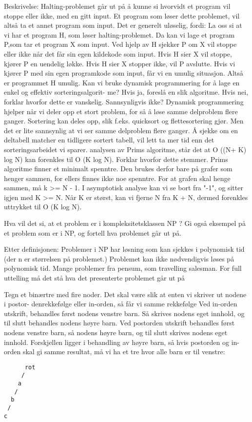 \documentclass[10pt,a4paper]{article}
\begin{document}
\begin{multicols}{4}
{Beskrivelse: Halting-problemet går ut på å kunne si hvorvidt et program vil stoppe eller
ikke, med en gitt input. Et program som løser dette problemet, vil altså ta et annet program
som input.
Det er generelt uløselig, fordi: La oss si at vi har et program H, som løser halting-problemet.
Da kan vi lage et program P,som tar et program X som input. Ved hjelp av H sjekker P om
X vil stoppe eller ikke når det får sin egen kildekode som input. Hvis H sier X vil stoppe,
kjører P en uendelig løkke. Hvis H sier X stopper ikke, vil P avslutte.
Hvis vi kjører P med sin egen programkode som input, får vi en umulig situasjon. Altså er
programmet H umulig.
\newline
Kan vi bruke dynamisk programmering for å lage en enkel og effektiv sorteringsalgorit-
me?
Hvis ja, foreslå en slik algoritme. Hvis nei, forklar hvorfor dette er vanskelig.
Sannsynligvis ikke? Dynamisk programmering hjelper når vi deler opp et stort problem,
for så å løse samme delproblem flere ganger. Sortering kan deles opp, slik f.eks. quicksort
og flettesortering gjør. Men det er lite sannsynlig at vi ser samme delproblem flere ganger.
Å sjekke om en deltabell matcher en tidligere sortert tabell, vil lett ta mer tid enn det
sorteringsarbeidet vi sparer.
\noindent
\color{orange} analysen av Prims algoritme, står det at O ((N+ K) log N) kan forenkles til O (K log N).
Forklar hvorfor dette stemmer.\color{black}
\noindent
Prims algoritme
finner et minimalt spenntre. Den brukes derfor bare på grafer som henger sammen, for ellers
finnes ikke noe spenntre. For at grafen skal henge sammen, må k >= N - 1. I asymptotisk
analyse kan vi se bort fra "-1", og sitter igjen med K >= N. Når K er størst, kan vi fjerne N fra
K + N, dermed forenkles uttrykket til O (K log N).

\color{orange} Hva vil det si, at et problem er i kompleksitetsklassen NP ? Gi også eksempel på et problem
som er i NP, og fortell hva problemet går ut på.\color{black}

Etter definisjonen: Problemer i NP har løsning som kan sjekkes i polynomisk tid (der n er
størrelsen på problemet.) Problemet kan ikke nødvendigvis løses på polynomisk tid.
Mange problemer fra pensum, som travelling salesman. For full uttelling må det stå hva
det presenterte problemet går ut på

\color{orange} Tegn et binærtre med fire noder. Det skal være slik at enten vi skriver ut nodene i postor-
denrekkefølge eller in-orden, så får vi samme rekkefølge\color{black}
Ved in-orden utskrift, behandles først nodens venstre barn. Så skrives nodens eget innhold, og
til slutt behandles nodens høyre barn.
Ved postorden utskrift behandles først nodens venstre barn, så nodens høyre barn, og til slutt
skrives nodens eget innhold.
Forskjellen ligger i behandling av høyre barn, så hvis postorden og in-orden skal gi samme
resultat, må vi ha et tre hvor alle barn er til venstre:
\begin{lstlisting}
      rot
     /
    a
   /
  b
 /
c


\end{lstlisting}}
\end{multicols}
\end{document}
